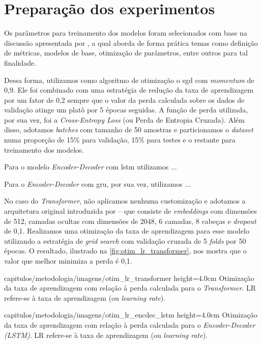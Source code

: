 \section{Preparação dos experimentos}
\label{sec:metodologia-preparacao-experimentos}

Os parâmetros para treinamento dos modelos foram selecionados com base na discussão apresentada por , a qual aborda de forma prática temas como definição de métricas, modelos de base, otimização de parâmetros, entre outros para tal finalidade.

Dessa forma, utilizamos como algoritmo de otimização o \acrfull{sgd} com \textit{momentum} de 0,9. Ele foi combinado com uma estratégia de redução da taxa de aprendizagem por um fator de 0,2 sempre que o valor da perda calculada sobre os dados de validação atinge um platô por 5 épocas seguidas. A função de perda utilizada, por sua vez, foi a \textit{Cross-Entropy Loss} (ou Perda de Entropia Cruzada). Além disso, adotamos \textit{batches} com tamanho de 50 amostras e particionamos o \textit{dataset} numa proporção de 15\% para validação, 15\% para testes e o restante para treinamento dos modelos.

Para o modelo \textit{Encoder-Decoder} com \acrshort{lstm} utilizamos ...

Para o \textit{Encoder-Decoder} com \acrshort{gru}, por sua vez, utilizamos ...

No caso do \textit{Transformer}, não aplicamos nenhuma customização e adotamos a arquitetura original introduzida por \cite{vaswani-2017-transformer} -- que consiste de \textit{embeddings} com dimensões de 512, camadas ocultas com dimensões de 2048, 6 camadas, 8 cabeças e \textit{dropout} de 0,1.
Realizamos uma otimização da taxa de aprendizagem para esse modelo utilizando a estratégia de \textit{grid search} com validação cruzada de 5 \textit{folds} por 50 épocas. O resultado, ilustrado na \autoref{fig:otim_lr_transformer}, nos mostra que o valor que melhor minimiza a perda é 0,1.

    {capitulos/metodologia/imagens/otim_lr_transformer}
    {height=4.0cm}
    {Otimização da taxa de aprendizagem com relação à perda calculada para o \textit{Transformer}. LR refere-se à taxa de aprendizagem (ou \textit{learning rate}).}
    {}

    {capitulos/metodologia/imagens/otim_lr_encdec_lstm}
    {height=4.0cm}
    {Otimização da taxa de aprendizagem com relação à perda calculada para o \textit{Encoder-Decoder (LSTM)}. LR refere-se à taxa de aprendizagem (ou \textit{learning rate}).}
    {}


